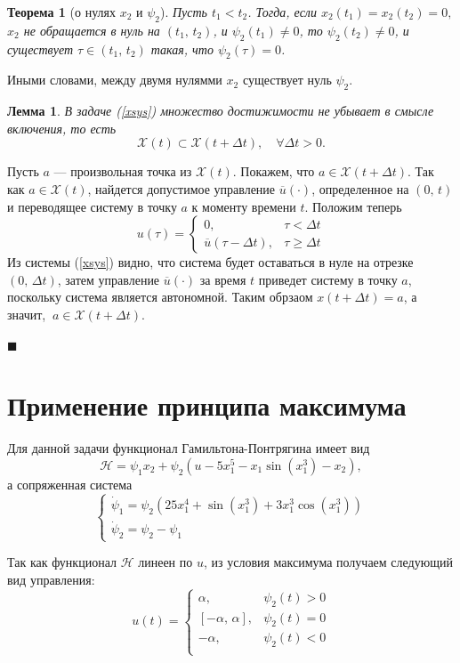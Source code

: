 \documentclass[16pt]{article}
\newtheorem{Th}{Теорема}
\newtheorem{Lem}{Лемма}
\newenvironment{Proof}{\par\noindent{\bf Доказательство.}}{\hfill$\scriptstyle\blacksquare$}
\newcommand\A{(\cdot)}
\newcommand\X{\mathcal{X}}
\begin{document}
\begin{Th}[о нулях $x_2$ и $\psi_2$]
Пусть $t_1 < t_2$. Тогда, если $x_2(t_1) = x_2(t_2) = 0,$ $x_2$ не обращается в нуль на $(t_1,\,t_2)$, и $\psi_2(t_1) \not= 0$,
то $\psi_2(t_2) \not= 0$, и существует $\tau \in(t_1,\,t_2)$ такая, что $\psi_2(\tau) = 0$.
\end{Th}
Иными словами, между двумя нулямми $x_2$ существует нуль $\psi_2$.
\newpage
\begin{Lem}
В задаче (\ref{xsys}) множество достижимости не убывает в смысле включения, то есть
$$\X(t) \subset \X(t + \Delta t), \quad \forall \Delta t > 0.$$
\end{Lem}
\begin{Proof}
Пусть $a$ --- произвольная точка из $\X(t)$. Покажем, что $a \in \X(t + \Delta t)$.
Так как $a \in \X(t)$, найдется допустимое управление $\overline{u}\A$, определенное на $(0,\, t)$ и
переводящее систему в точку $a$ к моменту
времени $t$. Положим теперь 
$$ u(\tau) = 
\begin{cases}
0, &\tau < \Delta t\\
\overline u(\tau - \Delta t), & \tau \geqslant \Delta t
\end{cases}
$$
Из системы (\ref{xsys}) видно, что система будет оставаться в нуле на отрезке $(0,\, \Delta t)$, затем управление
$\overline u \A$ за время $t$ приведет систему в точку $a$, поскольку система является автономной.
Таким обрзаом $x(t + \Delta t) = a$, а значит, $\ a \in \X(t + \Delta t)$.

\end{Proof}

\section{Применение принципа максимума}
Для данной задачи функционал Гамильтона-Понтрягина имеет вид
$$\mathcal{H} = \psi_1 x_2 + \psi_2(u-5x_1^5-x_1\sin(x_1^3)-x_2),$$
а сопряженная система
\begin{equation}\label{conj}\tag{СС}
\begin{cases}
\dot \psi_1 = \psi_2(25x_1^4 + \sin(x_1^3) + 3x_1^3\cos(x_1^3))\\
\dot \psi_2 = \psi_2 - \psi_1
\end{cases}
\end{equation}

Так как функционал $\mathcal{H}$ линеен по $u$, из условия максимума получаем следующий вид управления:
$$u(t) =
\begin{cases}
\alpha, & \psi_2(t) > 0\\
[-\alpha,\, \alpha], & \psi_2(t) = 0\\
-\alpha, & \psi_2(t) < 0\\
\end{cases}
$$
\end{document}
